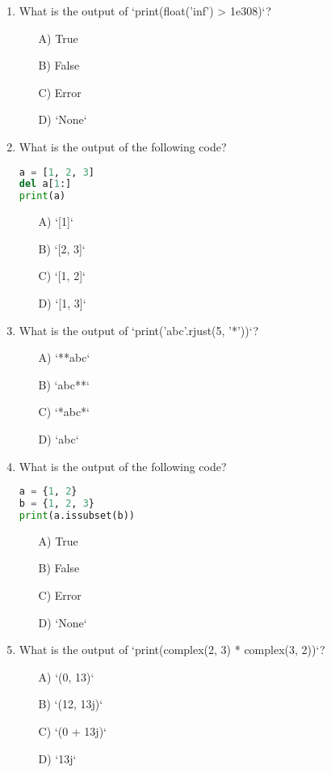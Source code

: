 \documentclass[9pt]{article}
\begin{document}
\begin{multicols}{2}
\begin{enumerate}
\item What is the output of `print(float('inf') > 1e308)`?
\begin{enumerate}
\item[A)] True
\item[B)] False
\item[C)] Error
\item[D)] `None`
\end{enumerate}

\item What is the output of the following code?
\begin{lstlisting}[language=Python]
a = [1, 2, 3]
del a[1:]
print(a)
\end{lstlisting}
\begin{enumerate}
\item[A)] `[1]`
\item[B)] `[2, 3]`
\item[C)] `[1, 2]`
\item[D)] `[1, 3]`
\end{enumerate}

\item What is the output of `print('abc'.rjust(5, '*'))`?
\begin{enumerate}
\item[A)] `**abc`
\item[B)] `abc**`
\item[C)] `*abc*`
\item[D)] `abc`
\end{enumerate}

\item What is the output of the following code?
\begin{lstlisting}[language=Python]
a = {1, 2}
b = {1, 2, 3}
print(a.issubset(b))
\end{lstlisting}
\begin{enumerate}
\item[A)] True
\item[B)] False
\item[C)] Error
\item[D)] `None`
\end{enumerate}

\item What is the output of `print(complex(2, 3) * complex(3, 2))`?
\begin{enumerate}
\item[A)] `(0, 13)`
\item[B)] `(12, 13j)`
\item[C)] `(0 + 13j)`
\item[D)] `13j`
\end{enumerate}


\end{enumerate}
\end{multicols}
\end{document}
